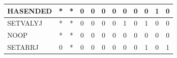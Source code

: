 \documentclass[12pt,a4paper,oneside]{article}
\begin{document}
\begin{table}[H]
\begin{tabular}{|l|ccccccccccc|}
    HASENDED        & *                       & *                       & 0                       & 0                       & 0                       & 0                       & 0                       & 0                        & 0                       & 1                       & 0                       \\ \cline{1-2} \hline
    SETVALYJ        & *                       & *                       & 0                       & 0                       & 0                       & 0                       & 1                       & 0                        & 1                       & 0                       & 0                       \\ \cline{1-2} \hline
    NOOP            & *                       & *                       & 0                       & 0                       & 0                       & 0                       & 0                       & 0                        & 0                       & 0                       & 0                       \\ \cline{1-2} \hline
    SETARRJ         & 0                       & *                       & 0                       & 0                       & 0                       & 0                       & 0                       & 0                        & 1                       & 0                       & 1                       \\ \cline{1-2} \hline
    \end{tabular}
\end{table}
\end{document}
